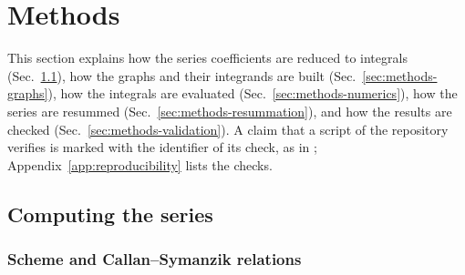 \section{Methods}
\label{sec:methods}

This section explains how the series coefficients are reduced to integrals (Sec.~\ref{sec:methods-series}), how
the graphs and their integrands are built (Sec.~\ref{sec:methods-graphs}), how the integrals are evaluated
(Sec.~\ref{sec:methods-numerics}), how the series are resummed (Sec.~\ref{sec:methods-resummation}), and how
the results are checked (Sec.~\ref{sec:methods-validation}). A claim that a script of the repository verifies is marked with the identifier of
its check, as in ; Appendix~\ref{app:reproducibility} lists the checks.

\subsection{Computing the series}
\label{sec:methods-series}

\subsubsection{Scheme and Callan--Symanzik relations}
\label{sec:methods-cs}

